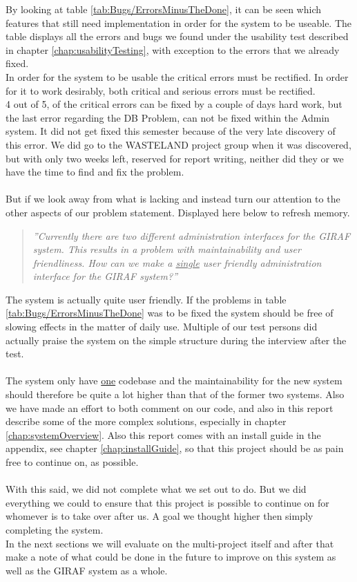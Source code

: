 By looking at table \ref{tab:Bugs/ErrorsMinusTheDone}, it can be seen which features that still need implementation in order for the system to be useable. The table displays all the errors and bugs we found under the usability test described in chapter \vref{chap:usabilityTesting}, with exception to the errors that we already fixed.\\
In order for the system to be usable the critical errors must be rectified. In order for it to work desirably, both critical and serious errors must be rectified.\\
4 out of 5, of the critical errors can be fixed by a couple of days hard work, but the last error regarding the DB Problem, can not be fixed within the Admin system. It did not get fixed this semester because of the very late discovery of this error. We did go to the WASTELAND project group when it was discovered, but with only two weeks left, reserved for report writing, neither did they or we have the time to find and fix the problem.\\
\\
But if we look away from what is lacking and instead turn our attention to the other aspects of our problem statement. Displayed here below to refresh memory.

\begin{verse}
\textit{''Currently there are two different administration interfaces for the GIRAF system.
This results in a problem with maintainability and user friendliness.
How can we make a \underline{single} user friendly administration interface for the GIRAF system?''}
\end{verse}

The system is actually quite user friendly. If the problems in table \ref{tab:Bugs/ErrorsMinusTheDone} was to be fixed the system should be free of slowing effects in the matter of daily use. Multiple of our test persons did actually praise the system on the simple structure during the interview after the test.\\
\\
The system only have \underline{one} codebase and the maintainability for the new system should therefore be quite a lot higher than that of the former two systems. Also we have made an effort to both comment on our code, and also in this report describe some of the more complex solutions, especially in chapter \vref{chap:systemOverview}. Also this report comes with an install guide in the appendix, see chapter \vref{chap:installGuide}, so that this project should be as pain free to continue on, as possible.\\
\\
With this said, we did not complete what we set out to do. But we did everything we could to ensure that this project is possible to continue on for whomever is to take over after us. A goal we thought higher then simply completing the system.\\
In the next sections we will evaluate on the multi-project itself and after that make a note of what could be done in the future to improve on this system as well as the GIRAF system as a whole.






